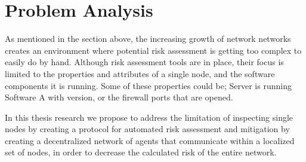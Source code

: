 \section{Problem Analysis}
\label{sec:problem-analysis}


As mentioned in the section above, the increasing growth of network networks creates an environment where potential risk assessment is getting too complex to easily do by hand. Although risk assessment tools are in place, their focus is limited to the properties and attributes of a single node, and the software components it is running. Some of these properties could be; Server is running Software A with version, or the firewall ports that are opened. 



In this thesis research we propose to address the limitation of inspecting single nodes by creating a protocol for automated risk assessment and mitigation by creating a decentralized network of agents that communicate within a localized set of nodes, in order to decrease the calculated risk of the entire network. 



